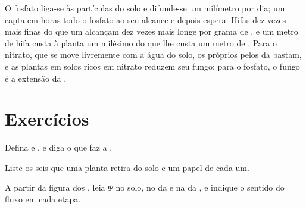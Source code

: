 \begin{example}\label{ex:b1:plant-water-minerals:phosphate}
O fosfato liga-se às partículas do solo e difunde-se um milímetro por
dia; um  capta em horas todo o fosfato ao seu alcance e
depois espera. Hifas dez vezes mais finas do que um 
alcançam dez vezes mais longe por grama de , e um metro de hifa
custa à planta um milésimo do que lhe custa um metro de . Para o
nitrato, que se move livremente com a água do solo, os próprios pelos
da  bastam, e as plantas em solos ricos em nitrato reduzem seu
fungo; para o fosfato, o fungo é a extensão da .
\end{example}

\section{Exercícios}

\begin{exercise}[$\star$]\label{exo:b1:plant-water-minerals:1}
Defina  e , e diga o que faz a .
\end{exercise}

\begin{exercise}[$\star$]\label{exo:b1:plant-water-minerals:2}
Liste os seis  que uma planta retira do solo e um papel
de cada um.
\end{exercise}

\begin{exercise}[$\star$]\label{exo:b1:plant-water-minerals:3}
A partir da figura dos , leia $\Psi$ no solo, no
 da  e na  da , e indique o sentido do fluxo em
cada etapa.
\end{exercise}

